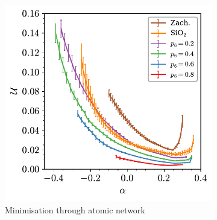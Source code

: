 
\begin{figure}[bt]
     \centering
     
     \begin{subfigure}[b]{0.45\textwidth}
         \centering
         \includegraphics[width=\textwidth]{./figures/targeted_opt/topt_u_graph.pdf}
         \caption{Minimisation through atomic network}
         \label{fig:toptenergy1}
     \end{subfigure}
     \hfill
	\begin{subfigure}[b]{0.45\textwidth}
         \centering

\end{subfigure}
\end{figure}
